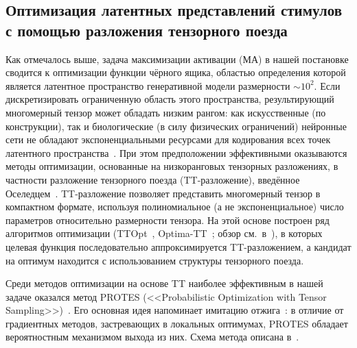 %


\subsection{Оптимизация латентных представлений стимулов с помощью разложения тензорного поезда}\label{sec:mango_tt}

Как отмечалось выше, задача максимизации активации (МА) в нашей постановке сводится к оптимизации функции чёрного ящика, областью определения которой является латентное пространство генеративной модели размерности $\sim\!10^{2}$. Если дискретизировать ограниченную область этого пространства, результирующий многомерный тензор может обладать низким рангом: как искусственные (по конструкции), так и биологические (в силу физических ограничений) нейронные сети не обладают экспоненциальными ресурсами для кодирования всех точек латентного пространства~\cite{low-rank-in-living-neurons-activity,low-rank-in-living-neurons-activity-2}. При этом предположении эффективными оказываются методы оптимизации, основанные на низкоранговых тензорных разложениях, в частности разложение тензорного поезда (TT-разложение), введённое Оселедцем~\cite{TT-Oseledets}. TT-разложение позволяет представить многомерный тензор в компактном формате, используя полиномиальное (а не экспоненциальное) число параметров относительно размерности тензора. На этой основе построен ряд алгоритмов оптимизации (TTOpt~\cite{TTOpt-paper}, Optima-TT~\cite{Optima-TT-Chertkov}; обзор см.~в~\cite{Cichocki-tensors-for-optimization-1,Cichocki-tensors-for-optimization-2}), в которых целевая функция последовательно аппроксимируется TT-разложением, а кандидат на оптимум находится с использованием структуры тензорного поезда.

Среди методов оптимизации на основе TT наиболее эффективным в нашей задаче оказался метод PROTES (<<Probabilistic Optimization with Tensor Sampling>>)~\cite{PROTES-Chertkov-paper}. Его основная идея напоминает имитацию отжига~\cite{Simulated-annealing-what-is}: в отличие от градиентных методов, застревающих в локальных оптимумах, PROTES обладает вероятностным механизмом выхода из них. Схема метода описана в~\cite{PROTES-Chertkov-paper}.


